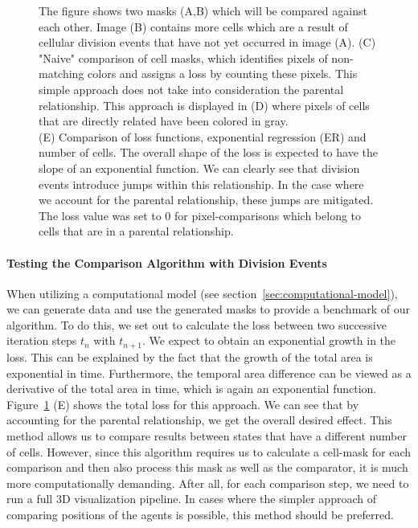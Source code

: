 \documentclass{article}
\begin{document}
\begin{figure}[H]
\begin{minipage}{0.49\textwidth}
\begin{tikzonimage}[width=\textwidth]
        \end{tikzonimage}
    \end{minipage}
    \caption{
        The figure shows two masks (A,B) which will be compared against each other.
        Image (B) contains more cells which are a result of cellular division events that have not
        yet occurred in image (A).
        (C) "Naive" comparison of cell masks, which identifies pixels of non-matching colors and
        assigns a loss by counting these pixels.
        This simple approach does not take into consideration the parental relationship.
        This approach is displayed in (D) where pixels of cells that are directly related have been
        colored in gray.\\
        (E) Comparison of loss functions, exponential regression (ER) and number of cells.
        The overall shape of the loss is expected to have the slope of an exponential function.
        We can clearly see that division events introduce jumps within this relationship.
        In the case where we account for the parental relationship, these jumps are mitigated.
        The loss value was set to $0$ for pixel-comparisons which belong to cells that are in a
        parental relationship.
    }
    \label{fig:mask-difference-metric}
\end{figure}

\paragraph{Testing the Comparison Algorithm with Division Events}
When utilizing a computational model (see section~\ref{sec:computational-model}), we can generate
data and use the generated masks to provide a benchmark of our algorithm.
To do this, we set out to calculate the loss between two successive iteration steps
$t_n$ with $t_{n+1}$.
We expect to obtain an exponential growth in the loss.
This can be explained by the fact that the growth of the total area is exponential in time.
Furthermore, the temporal area difference can be viewed as a derivative of the total area in time,
which is again an exponential function.
Figure~\ref{fig:mask-difference-metric} (E) shows the total loss for this approach.
We can see that by accounting for the parental relationship, we get the overall desired effect.
This method allows us to compare results between states that have a different number of cells.
However, since this algorithm requires us to calculate a cell-mask for each comparison and then also
process this mask as well as the comparator, it is much more computationally demanding.
After all, for each comparison step, we need to run a full 3D visualization pipeline.
In cases where the simpler approach of comparing positions of the agents is possible, this method
should be preferred.
\end{document}
